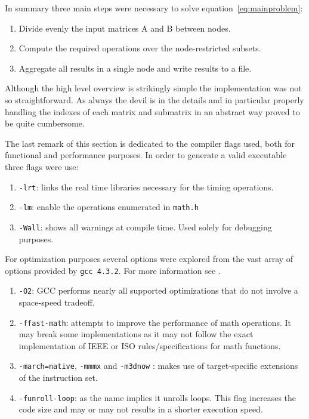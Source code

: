In summary three main steps were necessary to solve equation~\ref{eq:mainproblem}:
\begin{enumerate}
\item Divide evenly the input matrices A and B between nodes.
\item Compute the required operations over the node-restricted subsets.
\item Aggregate all results in a single node and write results to a file.
\end{enumerate}

Although the high level overview is strikingly simple the implementation was not so straightforward. As always the devil is in the details and in particular properly handling the indexes of each matrix and submatrix in an abstract way proved to be quite cumbersome.

The last remark of this section is dedicated to the compiler flags used, both for functional and performance purposes.
In order to generate a valid executable three flags were use:
\begin{enumerate}
\item \texttt{-lrt}: links the real time libraries necessary for the timing operations.
\item \texttt{-lm}: enable the operations enumerated in \texttt{math.h}
\item \texttt{-Wall}: shows all warnings at compile time. Used solely for debugging purposes.
\end{enumerate}

For optimization purposes several options were explored from the vast array of options provided by \texttt{gcc 4.3.2}. For more information see \cite{gcc}.

\begin{enumerate}
\item \texttt{-O2}: GCC performs nearly all supported optimizations that do not involve a space-speed tradeoff.
\item \texttt{-ffast-math}: attempts to improve the performance of math operations. It may break some implementations as it may not follow the exact implementation of IEEE or ISO rules/specifications for math functions.
\item \texttt{-march=native}, \texttt{-mmmx} and  \texttt{-m3dnow} : makes use of target-specific extensions of the instruction set.
\item \texttt{-funroll-loop}: as the name implies it unrolls loops. This flag increases the code size and may or may not results in a shorter execution speed.
\end{enumerate}

